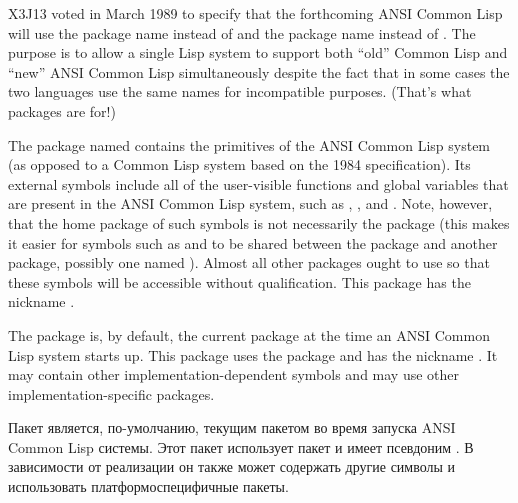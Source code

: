 \begin{newer}
X3J13 voted in March 1989  to specify that
the forthcoming ANSI Common Lisp will use the package name 
instead of  and the package name 
instead of .  The purpose is to allow a single Lisp system
to support both ``old'' Common Lisp and ``new'' ANSI Common Lisp
simultaneously despite the fact that in some cases
the two languages use the same
names for incompatible purposes.  (That's what packages are for!)

\begin{flushdesc}
\item[\cdf{common-lisp}]
The package named  contains the primitives of the
ANSI Common Lisp system (as opposed to a Common Lisp system based
on the 1984 specification).  Its external symbols include all of the
user-visible functions and global variables that are present in the
ANSI Common Lisp system, such as , , and .
Note, however, that the home package of such symbols is not
necessarily the  package (this makes it easier for
symbols such as  and  to be shared between
the  package and another package, possibly one named ).
Almost all other packages ought to use  so that these
symbols will be accessible without qualification.
This package has the nickname .

\item[\cdf{common-lisp-user}]
The  package is, by default,
the current package at the time an ANSI Common Lisp system starts up.
This package uses the  package
and has the nickname .
It may contain other implementation-dependent symbols
and may use other implementation-specific packages.

Пакет  является, по-умолчанию, текущим пакетом во время
запуска ANSI Common Lisp системы.
Этот пакет использует пакет  и имеет псевдоним .
В зависимости от реализации он также может содержать другие символы и
использовать платформоспецифичные пакеты.
\end{flushdesc}
\end{newer}

